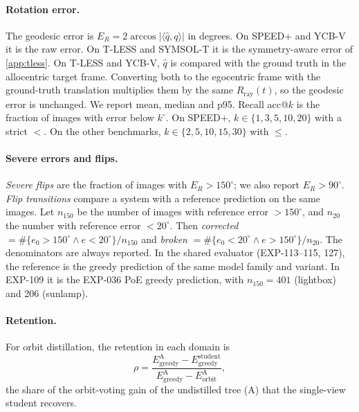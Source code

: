 \paragraph{Rotation error.}
The geodesic error is $E_R=2\arccos|\langle\hat q,q\rangle|$ in degrees. On SPEED+ and YCB-V it is the raw error. On T-LESS and SYMSOL-T it is the symmetry-aware error of \cref{app:tless}. On T-LESS and YCB-V, $\hat q$ is compared with the ground truth in the allocentric target frame. Converting both to the egocentric frame with the ground-truth translation multiplies them by the same $R_{\text{ray}}(t)$, so the geodesic error is unchanged.
We report mean, median and p95.
Recall acc@$k$ is the fraction of images with error below $k^\circ$. On SPEED+, $k\in\{1,3,5,10,20\}$ with a strict $<$. On the other benchmarks, $k\in\{2,5,10,15,30\}$ with $\le$.

\paragraph{Severe errors and flips.}
\emph{Severe flips} are the fraction of images with $E_R>150^\circ$; we also report $E_R>90^\circ$.
\emph{Flip transitions} compare a system with a reference prediction on the same images. Let $n_{150}$ be the number of images with reference error $>150^\circ$, and $n_{20}$ the number with reference error $<20^\circ$. Then
\emph{corrected} $=\#\{e_0>150^\circ \wedge e<20^\circ\}/n_{150}$ and
\emph{broken} $=\#\{e_0<20^\circ \wedge e>150^\circ\}/n_{20}$.
The denominators are always reported. In the shared evaluator (EXP-113--115, 127), the reference is the greedy prediction of the same model family and variant. In EXP-109 it is the EXP-036 PoE greedy prediction, with $n_{150}=401$ (lightbox) and 206 (sunlamp).

\paragraph{Retention.}
For orbit distillation, the retention in each domain is
\begin{equation*}
  \rho=\frac{E^{\text{A}}_{\text{greedy}}-E^{\text{student}}_{\text{greedy}}}{E^{\text{A}}_{\text{greedy}}-E^{\text{A}}_{\text{orbit}}},
\end{equation*}
the share of the orbit-voting gain of the undistilled tree (A) that the single-view student recovers.

